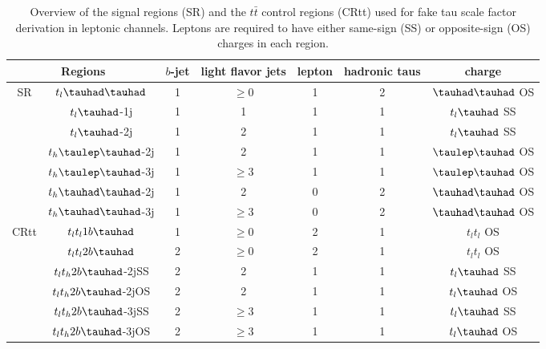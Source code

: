 \begin{table}
\centering
\caption{Overview of the signal regions (SR) and the $t\bar{t}$ control regions (CRtt) used for fake tau scale factor derivation in leptonic channels. Leptons are required to have either same-sign (SS) or opposite-sign (OS) charges in each region.}
\label{tab:srcr}
\begin{tabular}[h]{c|c|c|c|c|c|c}
\hline \hline
\multicolumn{2}{c|}{Regions} & $b$-jet & light flavor jets        & lepton & hadronic taus & charge\\ \hline
\multirow{7}{*}{SR}&$t_l\thadhad$     & 1     & $\ge0$                                & 1      & 2             & $\thadhad$ OS\\ \cline{2-7}
&$t_l\tauhad$-1j  & 1     & 1                                   & 1      & 1                     & $t_l\tauhad$ SS\\ \cline{2-7}
&$t_l\tauhad$-2j  & 1     & 2                                        & 1      & 1                     & $t_l\tauhad$ SS\\ \cline{2-7}
&$t_h\tlhad$-2j   & 1     & 2                           & 1      & 1             & $\tlhad$ OS\\ \cline{2-7}
&$t_h\tlhad$-3j   & 1     & $\ge3$                      & 1      & 1             & $\tlhad$ OS\\ \cline{2-7}
&$t_h\thadhad$-2j & 1     & 2                            & 0      & 2             & $\thadhad$ OS\\ \cline{2-7}
&$t_h\thadhad$-3j & 1     & $\ge3$                       & 0      & 2             & $\thadhad$ OS\\ \hline
\multirow{6}{*}{CRtt}&$t_lt_l1b\tauhad$ & 1     & $\ge0$                            & 2      & 1                     & $t_lt_l$ OS\\ \cline{2-7}
&$t_lt_l2b\tauhad$      & 2     & $\ge0$                            & 2      & 1                     & $t_lt_l$ OS\\ \cline{2-7}
&$t_lt_h2b\tauhad$-2jSS & 2     & 2                             & 1      & 1             & $t_l\tauhad$ SS\\ \cline{2-7}
&$t_lt_h2b\tauhad$-2jOS & 2     & 2                             & 1      & 1             & $t_l\tauhad$ OS\\ \cline{2-7}
&$t_lt_h2b\tauhad$-3jSS & 2     & $\ge3$                        & 1      & 1             & $t_l\tauhad$ SS\\ \cline{2-7}
&$t_lt_h2b\tauhad$-3jOS & 2     & $\ge3$                & 1      & 1             & $t_l\tauhad$ OS\\ \hline
\end{tabular}
\end{table}








